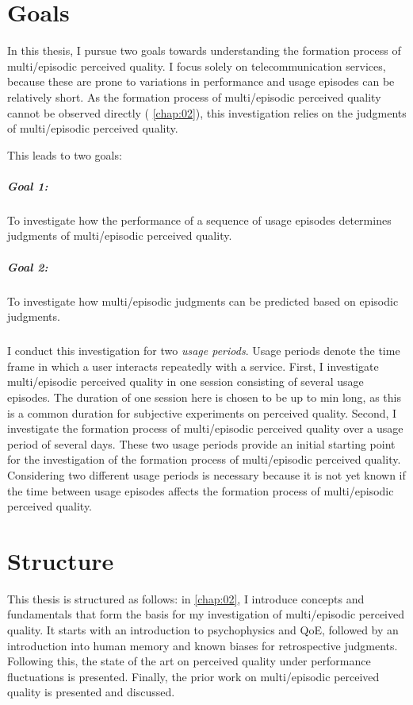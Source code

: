 \section{Goals}
In this thesis, I pursue two goals towards understanding the formation process of multi\-/episodic perceived quality.
I focus solely on telecommunication services, because these are prone to variations in performance and usage episodes can be relatively short.
As the formation process of multi\-/episodic perceived quality cannot be observed directly (\cf{} \autoref{chap:02}), this investigation relies on the judgments of multi\-/episodic perceived quality.

This leads to two goals:

\subparagraph*{Goal 1:}
To investigate how the performance of a sequence of usage episodes determines judgments of multi\-/episodic perceived quality.

\subparagraph*{Goal 2:}
To investigate how multi\-/episodic judgments can be predicted based on episodic judgments.

\subparagraph*{}
I conduct this investigation for two \emph{usage periods}.
Usage periods denote the time frame in which a user interacts repeatedly with a service.
First, I investigate multi\-/episodic perceived quality in one session consisting of several usage episodes.
The duration of one session here is chosen to be up to \unit[45]{min} long, as this is a common duration for subjective experiments on perceived quality.
Second, I investigate the formation process of multi\-/episodic perceived quality over a usage period of several days.
These two usage periods provide an initial starting point for the investigation of the formation process of multi\-/episodic perceived quality.
Considering two different usage periods is necessary because it is not yet known if the time between usage episodes affects the formation process of multi\-/episodic perceived quality.

\section{Structure}
This thesis is structured as follows:
in \autoref{chap:02}, I introduce concepts and fundamentals that form the basis for my investigation of multi\-/episodic perceived quality.
It starts with an introduction to psychophysics and \ac{QoE}, followed by an introduction into human memory and known biases for retrospective judgments.
Following this, the state of the art on perceived quality under performance fluctuations is presented.
Finally, the prior work on multi\-/episodic perceived quality is presented and discussed.


